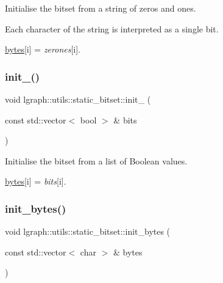 Initialise the bitset from a string of zeros and ones. 

Each character of the string is interpreted as a single bit.

\hyperlink{classlgraph_1_1utils_1_1static__bitset_a56d277fc22bbf71a27fca530a133c9bd}{bytes}\mbox{[}i\mbox{]} = {\itshape zerones}\mbox{[}i\mbox{]}. \mbox{\label{classlgraph_1_1utils_1_1static__bitset_a223b698841c841d517155f5cdcc1c9a4}} 
\subsubsection{\texorpdfstring{init\+\_()}{init\_01()}\hspace{0.1cm}{\footnotesize\ttfamily [2/2]}}
{\footnotesize\ttfamily void lgraph\+::utils\+::static\+\_\+bitset\+::init\+\_ (\begin{DoxyParamCaption}\item[{const std\+::vector$<$ bool $>$ \&}]{bits }\end{DoxyParamCaption})}



Initialise the bitset from a list of Boolean values. 

\hyperlink{classlgraph_1_1utils_1_1static__bitset_a56d277fc22bbf71a27fca530a133c9bd}{bytes}\mbox{[}i\mbox{]} = {\itshape bits}\mbox{[}i\mbox{]}. \mbox{\label{classlgraph_1_1utils_1_1static__bitset_a00b39bf2552cbab68a9d5ee7f430e59d}} 
\subsubsection{\texorpdfstring{init\+\_\+bytes()}{init\_bytes()}\hspace{0.1cm}{\footnotesize\ttfamily [1/2]}}
{\footnotesize\ttfamily void lgraph\+::utils\+::static\+\_\+bitset\+::init\+\_\+bytes (\begin{DoxyParamCaption}\item[{const std\+::vector$<$ char $>$ \&}]{bytes }\end{DoxyParamCaption})}



